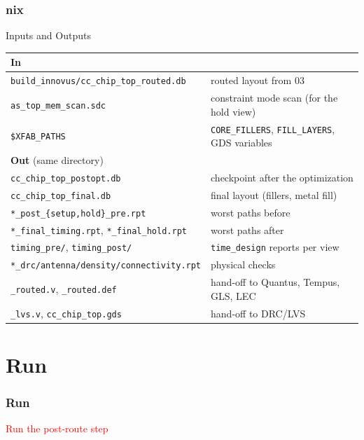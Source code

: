 \documentclass{beamer}
\newcommand{\astitle}{nix}
\newcommand{\assubtitle}{nix}
\newcommand{\cmd}[1]{\texttt{#1}}
\begin{document}
\renewcommand{\assubtitle}{Inputs and Outputs}
\begin{frame}
\frametitle{\astitle}
\begin{block}{\assubtitle}
  \scriptsize
  \begin{tabularx}{\linewidth}{@{}lY@{}}
    \textbf{In}                       & \\\hline
    \cmd{build\_innovus/cc\_chip\_top\_routed.db} & routed layout from 03\\[1pt]
    \cmd{as\_top\_mem\_scan.sdc}      & constraint mode scan (for the hold view)\\[1pt]
    \cmd{\$XFAB\_PATHS}               & \cmd{CORE\_FILLERS}, \cmd{FILL\_LAYERS},
                                        GDS variables\\[4pt]
    \textbf{Out} (same directory)     & \\\hline
    \cmd{cc\_chip\_top\_postopt.db}   & checkpoint after the optimization\\[1pt]
    \cmd{cc\_chip\_top\_final.db}     & final layout (fillers, metal fill)\\[1pt]
    \cmd{*\_post\_\{setup,hold\}\_pre.rpt} & worst paths before\\[1pt]
    \cmd{*\_final\_timing.rpt}, \cmd{*\_final\_hold.rpt} & worst paths after\\[1pt]
    \cmd{timing\_pre/}, \cmd{timing\_post/} & \cmd{time\_design} reports per view\\[1pt]
    \cmd{*\_drc/antenna/density/connectivity.rpt} & physical checks\\[1pt]
    \cmd{\_routed.v}, \cmd{\_routed.def} & hand-off to Quantus, Tempus, GLS, LEC\\[1pt]
    \cmd{\_lvs.v}, \cmd{cc\_chip\_top.gds} & hand-off to DRC/LVS\\
  \end{tabularx}
\end{block}
\end{frame}

\section{Run}
\renewcommand{\astitle}{Run}
\begin{frame}
\frametitle{\astitle}
\textcolor{red}{Run the post-route step}
\end{frame}
\end{document}
